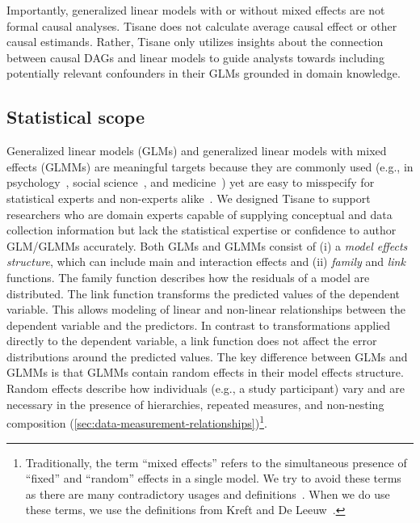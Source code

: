 Importantly, generalized linear models with or without mixed effects are not
formal causal analyses. Tisane does not calculate average causal effect or other
causal estimands. Rather, Tisane only utilizes insights about the connection
between causal DAGs and linear models to guide analysts towards including
potentially relevant confounders in their GLMs grounded in domain knowledge. 


\subsection{Statistical scope}  \label{sec:GLM}

Generalized linear models (GLMs) and generalized linear models with mixed
effects (GLMMs) are meaningful targets because they are commonly used (e.g., in
psychology~\cite{lo2015transform,cohen2013applied}, social
science~\cite{kreft1998introducing}, and
medicine~\cite{bolker2009generalized,barr2013random}) yet are easy to misspecify
for statistical experts and non-experts alike~\cite{barr2013random,
cohen2013applied}. We designed Tisane to support researchers who are domain
experts capable of supplying conceptual and data collection information but lack
the statistical expertise or confidence to author GLM/GLMMs accurately.
Both GLMs and GLMMs consist of (i) a \textit{model effects structure},
which can include main and interaction effects and (ii) \textit{family} and
\textit{link} functions. The family function describes how the residuals of a
model are distributed. The link function transforms the predicted values of the
dependent variable. This allows modeling of linear and non-linear relationships
between the dependent variable and the predictors. In contrast to
transformations applied directly to the dependent variable, a link function does
not affect the error distributions around the predicted values. The key
difference between GLMs and GLMMs is that GLMMs contain random effects in their
model effects structure. Random effects describe how individuals (e.g., a study
participant) vary and are necessary in the presence of hierarchies, repeated
measures, and non-nesting composition
(\autoref{sec:data-measurement-relationships})\footnote{Traditionally, the term
``mixed effects'' refers to the simultaneous presence of ``fixed'' and
``random'' effects in a single model. We try to avoid these terms as there are
many contradictory usages and definitions~\cite{gelmanFixedRandom}. When we do
use these terms, we use the definitions from Kreft and De
Leeuw~\cite{kreft1998introducing}.}.

